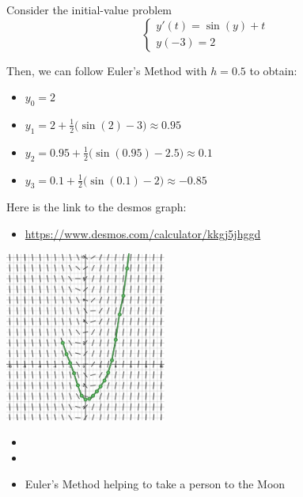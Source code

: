 \begin{example}
Consider the initial-value problem
$$
\begin{cases}
y'(t) = \sin(y)+t \\
y(-3)=2
\end{cases}
$$

\begin{minipage}{.65\textwidth}
Then, we can follow Euler's Method with $h=0.5$ to obtain:
\begin{itemize}
	\item $y_0=2$
	\item $y_1 = 2 + \frac12 \big(\sin(2) -3\big) \approx 0.95$
	\item $y_2 = 0.95 + \frac12 \big(\sin(0.95) -2.5\big) \approx 0.1$
	\item $y_3 = 0.1 + \frac12 \big(\sin(0.1) -2\big) \approx -0.85$
\end{itemize}

	
\begin{minipage}{220pt}
Here is the link to the desmos graph: 
\begin{itemize}
	\item \href{https://www.desmos.com/calculator/kkgj5jhggd}{https://www.desmos.com/calculator/kkgj5jhggd} %
\end{itemize}
\end{minipage}
\hfill
\begin{minipage}{55pt}
\end{minipage}
\end{minipage}
\hfill
\begin{minipage}{150pt}
	\includegraphics*[width=150pt]{images/module10-Euler-small.pdf}
\end{minipage}	

\end{example}


\begin{video}
\begin{itemize}
	\item {}
	\item {}
	\item Euler's Method helping to take a person to the Moon \hfill {}
\end{itemize}	
\end{video}





